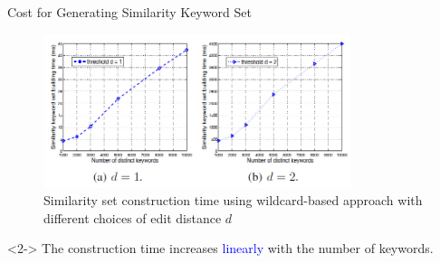 \documentclass[handout]{beamer}
\begin{document}
\begin{frame}{Cost for Generating Similarity Keyword Set}
	\begin{figure}
        \includegraphics[width=0.8\textwidth]{subfig1.jpg}
        \caption{Similarity set construction time using wildcard-based approach with different choices of edit distance $d$}
	\end{figure}
	\begin{block}<2->{}
		The construction time increases \textcolor{blue}{linearly} with the number of keywords.
	\end{block}
\end{frame}
\end{document}
